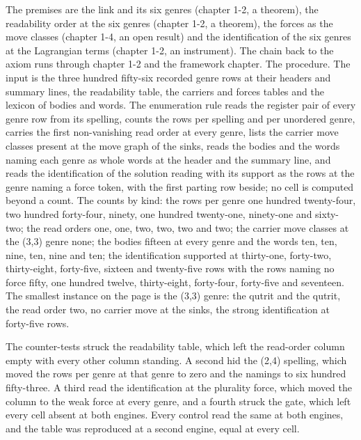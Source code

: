 \begin{chproof}[instrument]
The premises are the link and its six genres (chapter 1-2, a theorem), the readability order at the six genres (chapter 1-2, a theorem), the forces as the move classes (chapter 1-4, an open result) and the identification of the six genres at the Lagrangian terms (chapter 1-2, an instrument). The chain back to the axiom runs through chapter 1-2 and the framework chapter. The procedure. The input is the three hundred fifty-six recorded genre rows at their headers and summary lines, the readability table, the carriers and forces tables and the lexicon of bodies and words. The enumeration rule reads the register pair of every genre row from its spelling, counts the rows per spelling and per unordered genre, carries the first non-vanishing read order at every genre, lists the carrier move classes present at the move graph of the sinks, reads the bodies and the words naming each genre as whole words at the header and the summary line, and reads the identification of the solution reading with its support as the rows at the genre naming a force token, with the first parting row beside; no cell is computed beyond a count. The counts by kind: the rows per genre one hundred twenty-four, two hundred forty-four, ninety, one hundred twenty-one, ninety-one and sixty-two; the read orders one, one, two, two, two and two; the carrier move classes at the (3,3) genre none; the bodies fifteen at every genre and the words ten, ten, nine, ten, nine and ten; the identification supported at thirty-one, forty-two, thirty-eight, forty-five, sixteen and twenty-five rows with the rows naming no force fifty, one hundred twelve, thirty-eight, forty-four, forty-five and seventeen. The smallest instance on the page is the (3,3) genre: the qutrit and the qutrit, the read order two, no carrier move at the sinks, the strong identification at forty-five rows.

The counter-tests struck the readability table, which left the read-order column empty with every other column standing. A second hid the (2,4) spelling, which moved the rows per genre at that genre to zero and the namings to six hundred fifty-three. A third read the identification at the plurality force, which moved the column to the weak force at every genre, and a fourth struck the gate, which left every cell absent at both engines. Every control read the same at both engines, and the table was reproduced at a second engine, equal at every cell.
\end{chproof}

